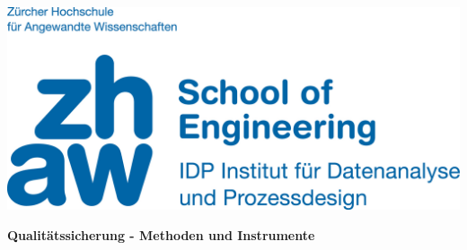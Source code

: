 \noindent
\begin{minipage}[t]{0.4\textwidth} 
\includegraphics[width=\linewidth]{logo.jpg}
\end{minipage}%
\hfill%
\begin{minipage}[t]{0.4\textwidth}\raggedleft
\end{minipage}

\begin{center}
 \textbf{\large Qualitätssicherung - Methoden und Instrumente} \\
 \vspace{0.3cm}
\end{center}
